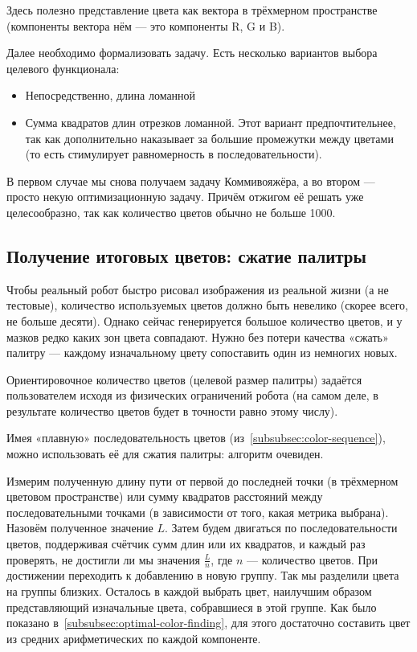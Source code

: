 Здесь полезно представление цвета как вектора в трёхмерном пространстве (компоненты вектора нём — это компоненты R, G и B).

Далее необходимо формализовать задачу.
Есть несколько вариантов выбора целевого функционала:
\begin{itemize}
    \item Непосредственно, длина ломанной
    \item Сумма квадратов длин отрезков ломанной.
    Этот вариант предпочтительнее, так как дополнительно наказывает за большие промежутки между цветами
    (то есть стимулирует равномерность в последовательности).
\end{itemize}

В первом случае мы снова получаем задачу Коммивояжёра, а во втором — просто некую оптимизационную задачу.
Причём отжигом её решать уже целесообразно, так как количество цветов обычно не больше 1000.


\subsection{Получение итоговых цветов: сжатие палитры}\label{subsec:getting-final-colors}
Чтобы реальный робот быстро рисовал изображения из реальной жизни (а не тестовые),
количество используемых цветов должно быть невелико (скорее всего, не больше десяти).
Однако сейчас генерируется большое количество цветов, и у мазков редко каких зон цвета совпадают.
Нужно без потери качества «сжать» палитру — каждому изначальному цвету сопоставить один из немногих новых.

Ориентировочное количество цветов (целевой размер палитры) задаётся пользователем исходя из физических ограничений робота
(на самом деле, в результате количество цветов будет в точности равно этому числу).

Имея «плавную» последовательность цветов (из~\ref{subsubsec:color-sequence}),
можно использовать её для сжатия палитры: алгоритм очевиден.

Измерим полученную длину пути от первой до последней точки (в трёхмерном цветовом пространстве)
или сумму квадратов расстояний между последовательными точками (в зависимости от того, какая метрика выбрана).
Назовём полученное значение $L$.
Затем будем двигаться по последовательности цветов, поддерживая счётчик сумм длин или их квадратов,
и каждый раз проверять, не достигли ли мы значения $\frac{L}{n}$, где $n$ — количество цветов.
При достижении переходить к добавлению в новую группу.
Так мы разделили цвета на группы близких.
Осталось в каждой выбрать цвет, наилучшим образом представляющий изначальные цвета, собравшиеся в этой группе.
Как было показано в~\ref{subsubsec:optimal-color-finding}, для этого достаточно составить цвет из средних арифметических по каждой компоненте.
